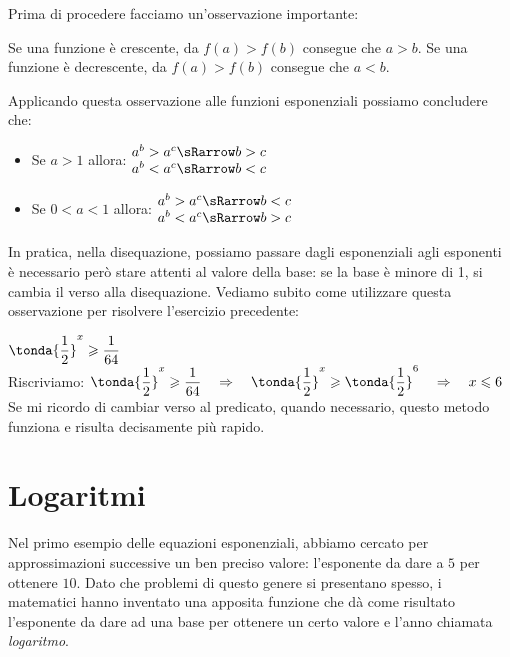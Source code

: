 Prima di procedere facciamo un'osservazione importante: 

\begin{osservazione}
Se una funzione è crescente, da \(f(a)>f(b)\) consegue che \(a>b\).
Se una funzione è decrescente, da \(f(a)>f(b)\) consegue che \(a<b\).
\end{osservazione}
Applicando questa osservazione alle funzioni esponenziali possiamo 
concludere che:

\begin{itemize}
 \item Se \(a>1\) allora: \quad \(\begin{matrix}
 a^b>a^c \sRarrow b>c \\
 a^b<a^c \sRarrow b<c \\
\end{matrix}\)
 \item Se \(0<a<1\) allora: \quad \(\begin{matrix}
 a^b>a^c \sRarrow b<c \\
 a^b<a^c \sRarrow b>c \\
\end{matrix}\)
\end{itemize}
In pratica, nella disequazione, possiamo passare dagli esponenziali agli 
esponenti è necessario però stare attenti al valore della base: 
se la base è minore di 1, si cambia il verso alla disequazione. 
Vediamo subito come utilizzare questa osservazione per risolvere 
l'esercizio precedente:


\begin{esempio}
 \(\tonda{\dfrac{1}{2}}^x \geqslant \dfrac{1}{64}\)\\[4pt]
 Riscriviamo:  \(\tonda{\dfrac{1}{2}}^x \geqslant \dfrac{1}{64} 
\quad\Rightarrow\quad
    \tonda{\dfrac{1}{2}}^x \geqslant \tonda{\dfrac{1}{2}}^6 
\quad\Rightarrow\quad 
    x \leqslant 6\)
\\[6pt]
Se mi ricordo di cambiar verso al predicato, quando necessario, questo 
metodo funziona e risulta decisamente più rapido.
\end{esempio}

\newpage %

\section{Logaritmi}
\label{sec:esplog_logaritmi}

Nel primo esempio delle equazioni esponenziali, abbiamo cercato per 
approssimazioni successive un ben preciso valore: 
l'esponente da dare a \(5\) per ottenere \(10\).
Dato che problemi di questo genere si presentano spesso, i matematici hanno 
inventato una apposita funzione che dà come risultato l'esponente da dare ad 
una base per ottenere un certo valore e l'anno chiamata \emph{logaritmo}.

